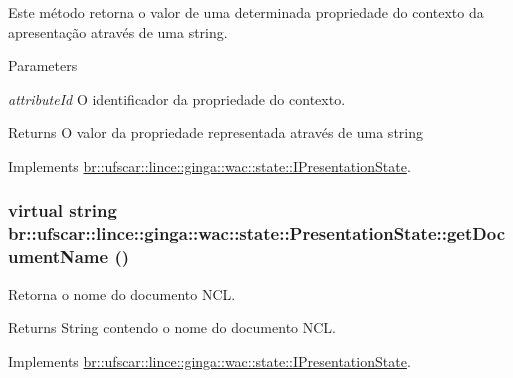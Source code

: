 Este método retorna o valor de uma determinada propriedade do contexto da apresentação através de uma string. 


\begin{DoxyParams}{Parameters}
\item[{\em attributeId}]O identificador da propriedade do contexto. \end{DoxyParams}
\begin{DoxyReturn}{Returns}
O valor da propriedade representada através de uma string 
\end{DoxyReturn}


Implements \hyperlink{classbr_1_1ufscar_1_1lince_1_1ginga_1_1wac_1_1state_1_1IPresentationState_a3d16c8c6c2c90ef84313414072d953cf}{br::ufscar::lince::ginga::wac::state::IPresentationState}.

\hypertarget{classbr_1_1ufscar_1_1lince_1_1ginga_1_1wac_1_1state_1_1PresentationState_a90a8797bdaffaed86c5a686652fea889}{
\subsubsection[{getDocumentName}]{\setlength{\rightskip}{0pt plus 5cm}virtual string br::ufscar::lince::ginga::wac::state::PresentationState::getDocumentName ()}}
\label{classbr_1_1ufscar_1_1lince_1_1ginga_1_1wac_1_1state_1_1PresentationState_a90a8797bdaffaed86c5a686652fea889}


Retorna o nome do documento NCL. 

\begin{DoxyReturn}{Returns}
String contendo o nome do documento NCL. 
\end{DoxyReturn}


Implements \hyperlink{classbr_1_1ufscar_1_1lince_1_1ginga_1_1wac_1_1state_1_1IPresentationState_a20c06c68a1db0160932abf7d6aa4967c}{br::ufscar::lince::ginga::wac::state::IPresentationState}.


